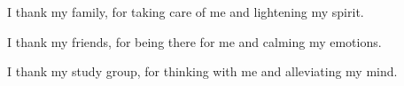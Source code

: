 
I thank my family, for taking care of me and lightening my spirit.

\noindent I thank my friends, for being there for me and calming my emotions.

\noindent I thank my study group, for thinking with me and alleviating my mind.

